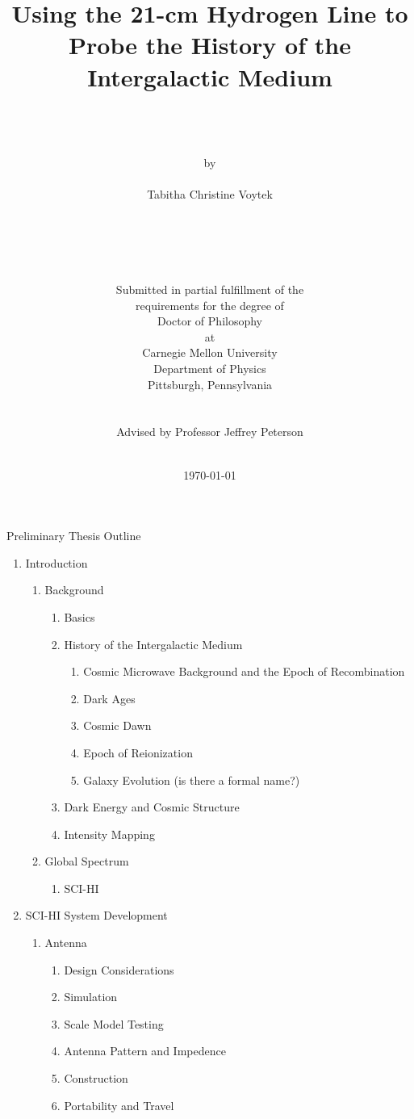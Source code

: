 \documentclass[12pt,twoside]{report}
\author{\\
	\\
	\\
	by \\
	\\
      	Tabitha Christine Voytek \\
	\\
	\\
	\\
	\\
	\\
        Submitted in partial fulfillment of the \\
        requirements for the degree of \\
        Doctor of Philosophy \\
        at \\
        Carnegie Mellon University \\
        Department of Physics \\
        Pittsburgh, Pennsylvania \\
	\\
        \\
	Advised by Professor Jeffrey Peterson
	\\
	\\
}
\title{\bf{
Using the 21-cm Hydrogen Line to Probe the History of the Intergalactic Medium 
}}
\date{\today}
\begin{document}
Preliminary Thesis Outline

\begin{enumerate}
\item Introduction

\begin{enumerate}
\item Background 

\begin{enumerate}
\item \cm Basics
\item History of the Intergalactic Medium

\begin{enumerate}
\item Cosmic Microwave Background and the Epoch of Recombination
\item Dark Ages
\item Cosmic Dawn
\item Epoch of Reionization
\item Galaxy Evolution (is there a formal name?)
\end{enumerate}

\item Dark Energy and Cosmic Structure
\item Intensity Mapping
\end{enumerate}

\item Global \cm Spectrum

\begin{enumerate}
\item SCI-HI
\end{enumerate}

\end{enumerate}

\item SCI-HI System Development

\begin{enumerate}
\item Antenna

\begin{enumerate}
\item Design Considerations
\item Simulation
\item Scale Model Testing
\item Antenna Pattern and Impedence
\item Construction
\item Portability and Travel
\end{enumerate}


\end{enumerate}
\end{enumerate}
\end{document}

